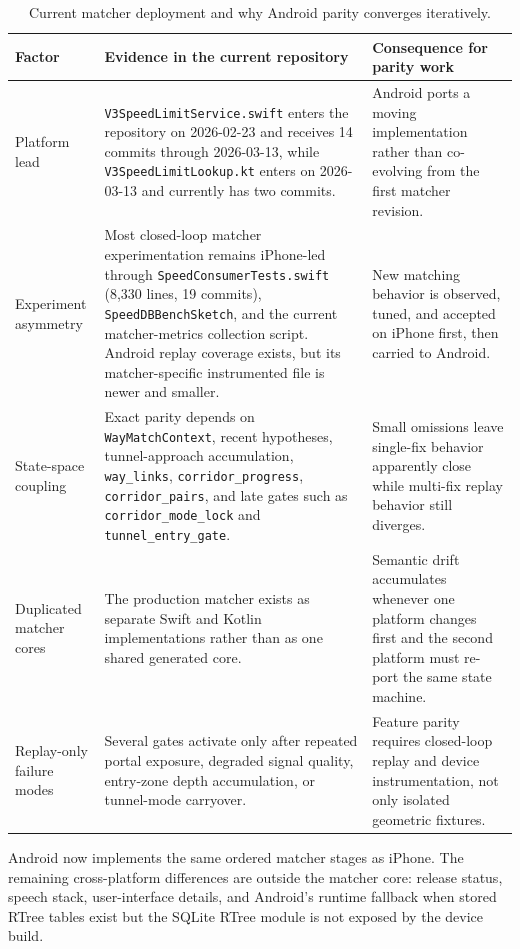 \documentclass{article}
\begin{document}
\begin{table}[!htbp]
\centering
\scriptsize
\caption{Current matcher deployment and why Android parity converges iteratively.}
\label{tab:parity_iterations}
\begin{tabular}{p{2.4cm}p{4.7cm}p{4.7cm}}
\toprule
Factor & Evidence in the current repository & Consequence for parity work \\
\midrule
Platform lead & \texttt{V3SpeedLimitService.swift} enters the repository on 2026-02-23 and receives 14 commits through 2026-03-13, while \texttt{V3SpeedLimitLookup.kt} enters on 2026-03-13 and currently has two commits. & Android ports a moving implementation rather than co-evolving from the first matcher revision. \\
Experiment asymmetry & Most closed-loop matcher experimentation remains iPhone-led through \texttt{SpeedConsumerTests.swift} (8{,}330 lines, 19 commits), \texttt{SpeedDBBenchSketch}, and the current matcher-metrics collection script. Android replay coverage exists, but its matcher-specific instrumented file is newer and smaller. & New matching behavior is observed, tuned, and accepted on iPhone first, then carried to Android. \\
State-space coupling & Exact parity depends on \texttt{WayMatchContext}, recent hypotheses, tunnel-approach accumulation, \texttt{way\_links}, \texttt{corridor\_progress}, \texttt{corridor\_pairs}, and late gates such as \texttt{corridor\_mode\_lock} and \texttt{tunnel\_entry\_gate}. & Small omissions leave single-fix behavior apparently close while multi-fix replay behavior still diverges. \\
Duplicated matcher cores & The production matcher exists as separate Swift and Kotlin implementations rather than as one shared generated core. & Semantic drift accumulates whenever one platform changes first and the second platform must re-port the same state machine. \\
Replay-only failure modes & Several gates activate only after repeated portal exposure, degraded signal quality, entry-zone depth accumulation, or tunnel-mode carryover. & Feature parity requires closed-loop replay and device instrumentation, not only isolated geometric fixtures. \\
\bottomrule
\end{tabular}
\end{table}

Android now implements the same ordered matcher stages as iPhone. The remaining cross-platform differences are outside the matcher core: release status, speech stack, user-interface details, and Android's runtime fallback when stored RTree tables exist but the SQLite RTree module is not exposed by the device build.
\end{document}
